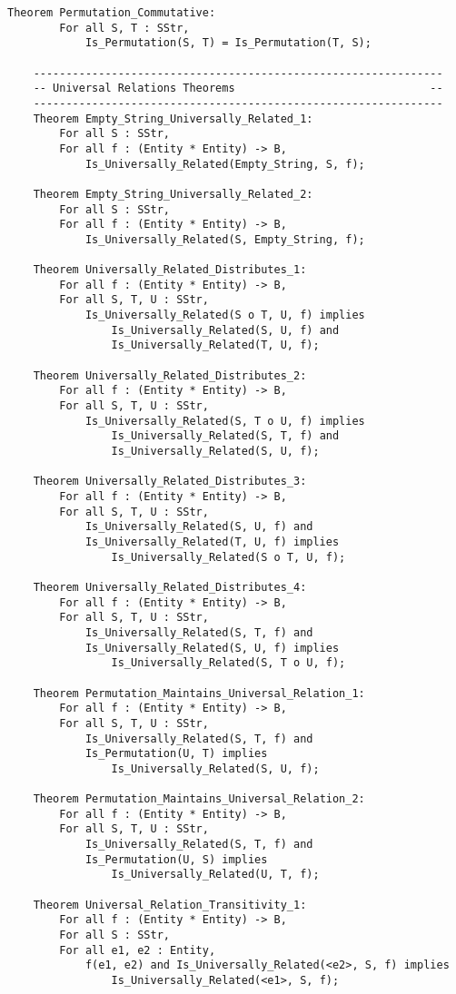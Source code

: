 \begin{lstlisting}[language=resolve]
	Theorem Permutation_Commutative:
		For all S, T : SStr,
			Is_Permutation(S, T) = Is_Permutation(T, S);

	---------------------------------------------------------------
	-- Universal Relations Theorems                              --
	---------------------------------------------------------------
	Theorem Empty_String_Universally_Related_1:
		For all S : SStr,
		For all f : (Entity * Entity) -> B,
			Is_Universally_Related(Empty_String, S, f);

	Theorem Empty_String_Universally_Related_2:
		For all S : SStr,
		For all f : (Entity * Entity) -> B,
			Is_Universally_Related(S, Empty_String, f);

	Theorem Universally_Related_Distributes_1:
		For all f : (Entity * Entity) -> B,
		For all S, T, U : SStr,
			Is_Universally_Related(S o T, U, f) implies
				Is_Universally_Related(S, U, f) and
				Is_Universally_Related(T, U, f);

	Theorem Universally_Related_Distributes_2:
		For all f : (Entity * Entity) -> B,
		For all S, T, U : SStr,
			Is_Universally_Related(S, T o U, f) implies
				Is_Universally_Related(S, T, f) and
				Is_Universally_Related(S, U, f);

	Theorem Universally_Related_Distributes_3:
		For all f : (Entity * Entity) -> B,
		For all S, T, U : SStr,
			Is_Universally_Related(S, U, f) and
			Is_Universally_Related(T, U, f) implies
				Is_Universally_Related(S o T, U, f);

	Theorem Universally_Related_Distributes_4:
		For all f : (Entity * Entity) -> B,
		For all S, T, U : SStr,
			Is_Universally_Related(S, T, f) and
			Is_Universally_Related(S, U, f) implies
				Is_Universally_Related(S, T o U, f);

	Theorem Permutation_Maintains_Universal_Relation_1:
		For all f : (Entity * Entity) -> B,
		For all S, T, U : SStr,
			Is_Universally_Related(S, T, f) and
			Is_Permutation(U, T) implies
				Is_Universally_Related(S, U, f);

	Theorem Permutation_Maintains_Universal_Relation_2:
		For all f : (Entity * Entity) -> B,
		For all S, T, U : SStr,
			Is_Universally_Related(S, T, f) and
			Is_Permutation(U, S) implies
				Is_Universally_Related(U, T, f);

	Theorem Universal_Relation_Transitivity_1:
		For all f : (Entity * Entity) -> B,
		For all S : SStr,
		For all e1, e2 : Entity,
			f(e1, e2) and Is_Universally_Related(<e2>, S, f) implies
				Is_Universally_Related(<e1>, S, f);


\end{lstlisting}
